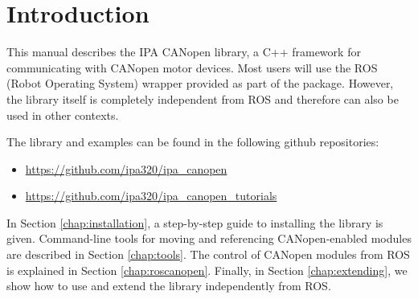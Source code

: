 \chapter{Introduction}
\label{chap:introduction}

This manual describes the IPA CANopen library, a C++ framework for communicating with CANopen motor devices. Most users will use the ROS (Robot Operating System) wrapper provided as part of the package. However, the library itself is completely independent from ROS and therefore can also be used in other contexts.

The library and examples can be found in the following github repositories:
\begin{itemize}
\item \url{https://github.com/ipa320/ipa_canopen}
\item \url{https://github.com/ipa320/ipa_canopen_tutorials}
\end{itemize}

In Section \ref{chap:installation}, a step-by-step guide to installing the library is given. Command-line tools for moving and referencing CANopen-enabled modules are described in Section \ref{chap:tools}. The control of CANopen modules from ROS is explained in Section \ref{chap:roscanopen}. Finally, in Section \ref{chap:extending}, we show how to use and extend the library independently from ROS.


